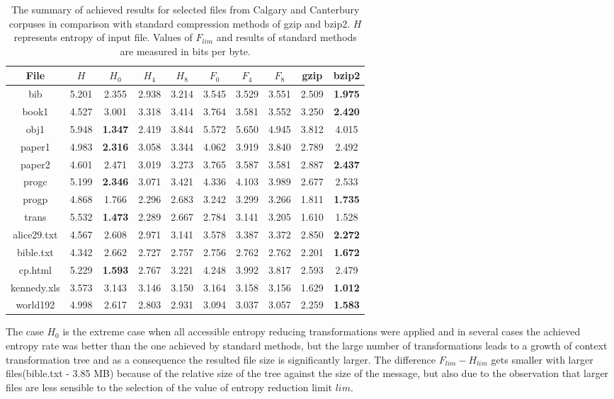 \documentclass[smallabstract,smallcaptions]{dccpaper}
\begin{document}
\begin{table}[!ht]
\begin{center}
{
\renewcommand{\baselinestretch}{1}\footnotesize
\begin{tabular}{|c|c|c|c|c|c|c|c|c|c|}
\hline 
File  & $H$ & $H_{0}$ & $H_{4}$ & $H_{8}$ & $F_{0}$ & $F_{4}$ & $F_{8}$ & gzip & bzip2\tabularnewline
\hline 
\hline 
bib & 5.201 & 2.355 & 2.938 & 3.214 &3.545 & 3.529 & 3.551 & 2.509 & \textbf{1.975}\tabularnewline
\hline 
book1 & 4.527 & 3.001 & 3.318 & 3.414 & 3.764 & 3.581 & 3.552 & 3.250 & \textbf{2.420}\tabularnewline
\hline 
obj1 & 5.948 & \textbf{1.347} & 2.419 & 3.844 & 5.572  & 5.650 & 4.945 & 3.812 & 4.015\tabularnewline
\hline 
paper1 & 4.983 & \textbf{2.316} & 3.058 & 3.344 & 4.062 & 3.919 & 3.840 & 2.789 & 2.492\tabularnewline
\hline
paper2 & 4.601 & 2.471 & 3.019 & 3.273 & 3.765 & 3.587 & 3.581 & 2.887 & \textbf{2.437}\tabularnewline
\hline 
progc & 5.199 & \textbf{2.346} & 3.071 & 3.421 & 4.336& 4.103 & 3.989 & 2.677 & 2.533\tabularnewline
\hline 
progp & 4.868 & 1.766 & 2.296 & 2.683 & 3.242 & 3.299 & 3.266 & 1.811 & \textbf{1.735}\tabularnewline
\hline 
trans & 5.532 & \textbf{1.473} & 2.289 & 2.667 & 2.784 & 3.141 & 3.205 & 1.610 & 1.528\tabularnewline
\hline 
\hline
alice29.txt & 4.567 & 2.608 & 2.971 & 3.141 & 3.578 & 3.387 & 3.372 & 2.850 & \textbf{2.272}\tabularnewline
\hline
bible.txt  & 4.342 & 2.662 & 2.727 & 2.757 & 2.756 & 2.762 & 2.762 & 2.201 & \textbf{1.672} \tabularnewline
\hline
cp.html & 5.229 & \textbf{1.593} & 2.767 & 3.221 & 4.248 & 3.992 & 3.817 & 2.593 & 2.479\tabularnewline
\hline
kennedy.xls & 3.573 & 3.143  & 3.146 & 3.150 & 3.164 & 3.158 & 3.156 & 1.629 & \textbf{1.012}\tabularnewline
\hline
world192 & 4.998 & 2.617 & 2.803 & 2.931 & 3.094 & 3.037 & 3.057 & 2.259 & \textbf{1.583}\tabularnewline
\hline
\end{tabular}
}
\caption{\label{tab:res2}%
The summary of achieved results for selected files from Calgary\cite{calgary} and Canterbury\cite{canterbury} corpuses in comparison with standard compression methods of gzip and bzip2. $H$ represents entropy of input file. Values of $F_{lim}$ and results of standard methods are measured in bits per byte.}
\end{center}
\end{table}

The case $H_0$ is the extreme case when all accessible entropy reducing transformations were applied and in several cases the achieved entropy rate was better than the one achieved by standard methods, but the large number of transformations leads to a growth of context transformation tree and as a consequence the resulted file size is significantly larger. The difference $F_{lim} - H_{lim}$ gets smaller with larger files(bible.txt - 3.85 MB) because of the relative size of the tree against the size of the message, but also due to the observation that larger files are less sensible to the selection of the value of entropy reduction limit $lim$.
\end{document}
